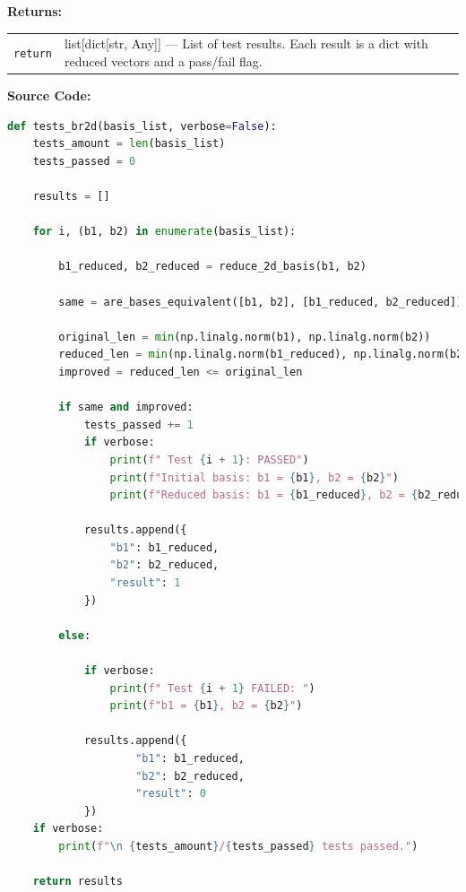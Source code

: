 \documentclass[a4paper,12pt]{article}
\begin{document}
\vspace{1em}
\noindent
\textbf{Returns:}

\begin{tabular}{p{3cm} p{11cm}}
\texttt{return} & list[dict[str, Any]] — List of test results. Each result is a dict with reduced vectors and a pass/fail flag. \\
\end{tabular}

\vspace{1em}
\textbf{Source Code:}

\begin{lstlisting}[language=Python]
def tests_br2d(basis_list, verbose=False):
    tests_amount = len(basis_list)
    tests_passed = 0

    results = []

    for i, (b1, b2) in enumerate(basis_list):

        b1_reduced, b2_reduced = reduce_2d_basis(b1, b2)

        same = are_bases_equivalent([b1, b2], [b1_reduced, b2_reduced])

        original_len = min(np.linalg.norm(b1), np.linalg.norm(b2))
        reduced_len = min(np.linalg.norm(b1_reduced), np.linalg.norm(b2_reduced))
        improved = reduced_len <= original_len

        if same and improved:
            tests_passed += 1
            if verbose:
                print(f" Test {i + 1}: PASSED")
                print(f"Initial basis: b1 = {b1}, b2 = {b2}")
                print(f"Reduced basis: b1 = {b1_reduced}, b2 = {b2_reduced}")

            results.append({
                "b1": b1_reduced,
                "b2": b2_reduced,
                "result": 1
            })

        else:

            if verbose:
                print(f" Test {i + 1} FAILED: ")
                print(f"b1 = {b1}, b2 = {b2}")

            results.append({
                    "b1": b1_reduced,
                    "b2": b2_reduced,
                    "result": 0
            })
    if verbose:
        print(f"\n {tests_amount}/{tests_passed} tests passed.")

    return results
\end{lstlisting}




\end{document}
